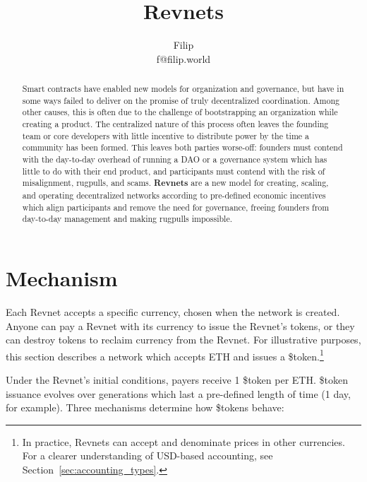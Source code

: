 \documentclass{article}
\title{Revnets}
\author{Filip\\f@filip.world}
\begin{document}
\maketitle

\begin{abstract}
  Smart contracts have enabled new models for organization and governance, but have in some ways failed to deliver on the promise of truly decentralized coordination. Among other causes, this is often due to the challenge of bootstrapping an organization while creating a product. The centralized nature of this process often leaves the founding team or core developers with little incentive to distribute power by the time a community has been formed. This leaves both parties worse-off: founders must contend with the day-to-day overhead of running a DAO or a governance system which has little to do with their end product, and participants must contend with the risk of misalignment, rugpulls, and scams. \textbf{Revnets} are a new model for creating, scaling, and operating decentralized networks according to pre-defined economic incentives which align participants and remove the need for governance, freeing founders from day-to-day management and making rugpulls impossible.
\end{abstract}

\section{Mechanism}

Each Revnet accepts a specific currency, chosen when the network is created. Anyone can pay a Revnet with its currency to issue the Revnet's tokens, or they can destroy tokens to reclaim currency from the Revnet. For illustrative purposes, this section describes a network which accepts ETH and issues a \$token.\footnote{In practice, Revnets can accept and denominate prices in other currencies. For a clearer understanding of USD-based accounting, see Section~\ref{sec:accounting_types}.}

Under the Revnet's initial conditions, payers receive 1 \$token per ETH. \$token issuance evolves over generations which last a pre-defined length of time (1 day, for example). Three mechanisms determine how \$tokens behave:
\end{document}
